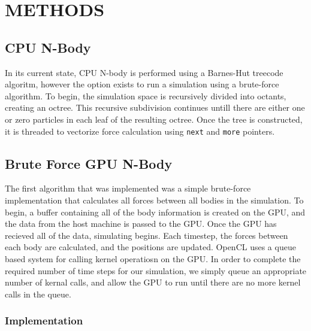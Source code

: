\documentclass{thesis}
\begin{document}
\chapter{METHODS}
\section{CPU N-Body}
In its current state, CPU N-body is performed using a Barnes-Hut treecode algoritm, however the option exists to run a simulation using a brute-force algorithm. To begin, the simulation space is recursively divided into octants, creating an octree. This recursive subdivision continues untill there are either one or zero particles in each leaf of the resulting octree. Once the tree is constructed, it is threaded to vectorize force calculation using \texttt{next} and \texttt{more} pointers. 
\section{Brute Force GPU N-Body}
The first algorithm that was implemented was a simple brute-force implementation that calculates all forces between all bodies in the simulation. To begin, a buffer containing all of the body information is created on the GPU, and the data from the host machine is passed to the GPU. Once the GPU has recieved all of the data, simulating begins. Each timestep, the forces between each body are calculated, and the positions are updated. OpenCL uses a queue based system for calling kernel operatiosn on the GPU. In order to complete the required number of time steps for our simulation, we simply queue an appropriate number of kernal calls, and allow the GPU to run until there are no more kernel calls in the queue.
\subsection{Implementation}
\end{document}
